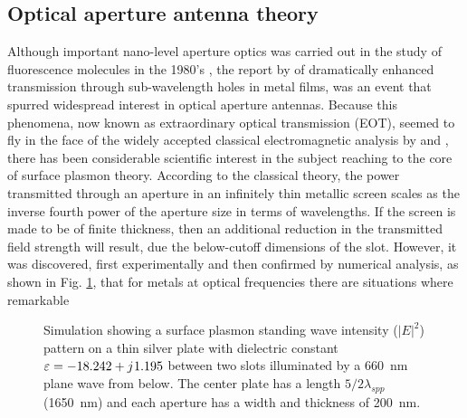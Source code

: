 \subsection{Optical aperture antenna theory}
%
Although important nano-level aperture optics was carried out in the study of fluorescence molecules in the 1980's \cite{Fischer1986}, the report by \cite{Ebbesen1998} of dramatically enhanced transmission through sub-wavelength holes in metal films, was an event that spurred widespread interest in optical aperture antennas. Because this phenomena, now known as extraordinary optical transmission (EOT), seemed to fly in the face of the widely accepted classical electromagnetic analysis by \cite{Bethe1944} and \cite{Bouwkamp1950}, there has been considerable scientific interest in the subject reaching to the core of surface plasmon theory. According to the classical theory, the power transmitted through an aperture in an infinitely thin metallic screen scales as the inverse fourth power of the aperture size in terms of wavelengths. If the screen is made to be of finite thickness, then an additional reduction in the transmitted field strength will result, due the below-cutoff dimensions of the slot. However, it was discovered, first experimentally and then confirmed by
numerical analysis, as shown in Fig. \ref{fig:cst_simulation}, that for metals at optical frequencies there are situations where remarkable
%
\begin{figure}[h!]
  \centering
  \caption{Simulation showing a surface plasmon standing wave intensity ($|E|^2$) pattern on a thin silver plate with dielectric constant $\varepsilon= -18.242 + j\mkern1mu 1.195$ between two slots illuminated by a \SI{660}{\nm} plane wave from below. The center plate has a length $5/2 \lambda_{spp}$ (\SI{1650}{\nm}) and each aperture has a width and thickness of \SI{200}{\nm}.}
  \label{fig:cst_simulation}
\end{figure}

